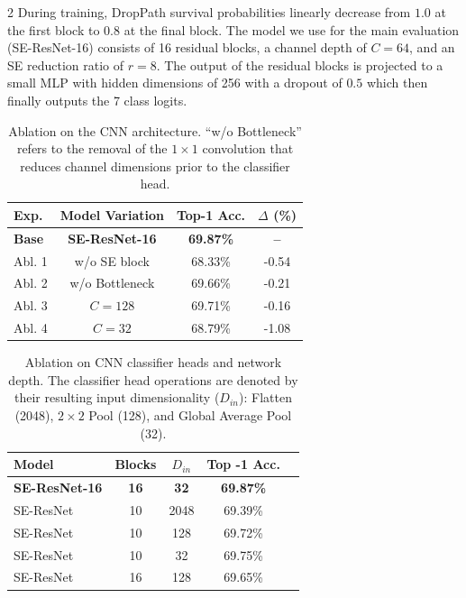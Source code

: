 \documentclass[a4paper,10pt]{article}
\begin{document}
\begin{multicols*}{2}
During training, DropPath survival probabilities linearly decrease from $1.0$ at the first block to $0.8$ at the final block. The model we use for the main evaluation (SE-ResNet-16) consists of 16 residual blocks, a channel depth of $C=64$, and an SE reduction ratio of $r=8$. The output of the residual blocks is projected to a small MLP with hidden dimensions of 256 with a dropout of $0.5$ which then finally outputs the 7 class logits.

\begin{table}[H]
\centering
\caption{Ablation on the CNN architecture. ``w/o Bottleneck'' refers to the removal of the $1 \times 1$ convolution that reduces channel dimensions prior to the classifier head.}
\label{tab:cnn_ablations}
\begin{tabular}{@{}lccc@{}}
\toprule
\textbf{Exp.} & \textbf{Model Variation} & \textbf{Top-1 Acc.} & \textbf{$\Delta$ (\%)} \\ \midrule
\textbf{Base} & \textbf{SE-ResNet-16} & \textbf{69.87\%} & \textbf{--}  \\ \midrule
Abl. 1 & w/o SE block & 68.33\% & -0.54 \\
Abl. 2 & w/o Bottleneck& 69.66\% & -0.21 \\
Abl. 3 & $C=128$ & 69.71\% & -0.16 \\
Abl. 4 & $C=32$ & 68.79\% & -1.08 \\ \bottomrule
\end{tabular}
\end{table}

\label{cnn_classifier_head}
\begin{table}[H]
\centering
\caption{Ablation on CNN classifier heads and network depth. The classifier head operations are denoted by their resulting input dimensionality ($D_{in}$): Flatten (2048), $2 \times 2$ Pool (128), and Global Average Pool (32).}
\label{tab:seresnet_pooling}
\begin{tabular}{@{}lcccc@{}}
\toprule
\textbf{Model} & \textbf{Blocks}  & \textbf{$D_{in}$} & \textbf{Top -1 Acc.} \\ \midrule
\textbf{SE-ResNet-16} & \textbf{16}  & \textbf{32} & \textbf{69.87\%} \\ \midrule
SE-ResNet & 10  & 2048 & 69.39\% \\
SE-ResNet & 10  & 128 & 69.72\% \\
SE-ResNet & 10  & 32 & 69.75\% \\
SE-ResNet & 16 & 128 & 69.65\% \\ \bottomrule
\end{tabular}
\end{table}


\end{multicols*}
\end{document}
